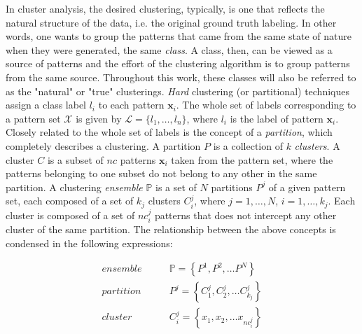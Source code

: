In cluster analysis, the desired clustering, typically, is one that reflects the natural structure of the data, i.e. the original ground truth labeling.
In other words, one wants to group the patterns that came from the same state of nature when they were generated, the same \emph{class}.
A class, then, can be viewed as a source of patterns and the effort of the clustering algorithm is to group patterns from the same source.
Throughout this work, these classes will also be referred to as the "natural" or "true" clusterings.
\emph{Hard} clustering (or partitional) techniques assign a class label $l_i$ to each pattern $\mathbf{x}_i$.
The whole set of labels corresponding to a pattern set $\mathcal{X}$ is given by $\mathcal{L} = \{ l_1, \ldots, l_n \}$, where $l_i$ is the label of pattern $\mathbf{x}_i$.
Closely related to the whole set of labels is the concept of a \emph{partition}, which completely describes a clustering.
A partition $P$ is a collection of $k$ \emph{clusters}.
A cluster $C$ is a subset of $nc$ patterns $\mathbf{x}_i$ taken from the pattern set, where the patterns belonging to one subset do not belong to any other in the same partition.
A clustering \emph{ensemble} $\mathbb{P}$ is a set of $N$ partitions $P^j$ of a given pattern set, each composed of a set of $k_j$ clusters $C^j_i$, where $j=1, \ldots, N$, $i=1, \ldots, k_j$.
Each cluster is composed of a set of $nc^j_i$ patterns that does not intercept any other cluster of the same partition.
The relationship between the above concepts is condensed in the following expressions:

\begin{align*}
    ensemble \qquad & \mathbb{P} = \left \{   P^1, P^2, \ldots P^N   \right \}  \\
    partition \qquad & P^j = \left \{   C^j_1, C^j_2, \ldots C^{j}_{k_j}   \right \}  \\
    cluster \qquad & C^j_i = \left \{   x_1, x_2, \ldots x_{nc^j_i}   \right \}
\end{align*}




